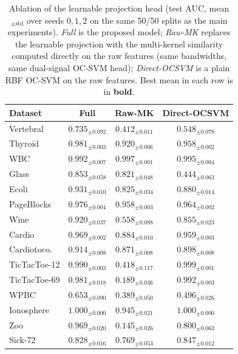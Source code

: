 \begin{table}[t]
\centering
\caption{Ablation of the learnable projection head (test AUC, mean$_{\pm\text{std}}$ over
seeds $0,1,2$ on the same 50/50 splits as the main experiments). \emph{Full} is the proposed
model; \emph{Raw-MK} replaces the learnable projection with the multi-kernel similarity
computed directly on the raw features (same bandwidths, same dual-signal OC-SVM head);
\emph{Direct-OCSVM} is a plain RBF OC-SVM on the raw features. Best mean in each row is in
\textbf{bold}.}
\label{tab:projhead}
\small
\setlength{\tabcolsep}{6pt}
\begin{tabular}{lccc}
\toprule
Dataset & Full & Raw-MK & Direct-OCSVM\\
\midrule
Vertebral     & $\mathbf{0.735}_{\pm0.092}$ & $0.412_{\pm0.011}$ & $0.548_{\pm0.078}$ \\
Thyroid       & $\mathbf{0.981}_{\pm0.003}$ & $0.920_{\pm0.006}$ & $0.958_{\pm0.002}$ \\
WBC           & $0.992_{\pm0.007}$ & $\mathbf{0.997}_{\pm0.001}$ & $0.995_{\pm0.004}$ \\
Glass         & $\mathbf{0.853}_{\pm0.058}$ & $0.821_{\pm0.048}$ & $0.444_{\pm0.063}$ \\
Ecoli         & $\mathbf{0.931}_{\pm0.010}$ & $0.825_{\pm0.034}$ & $0.880_{\pm0.014}$ \\
PageBlocks    & $\mathbf{0.976}_{\pm0.004}$ & $0.958_{\pm0.003}$ & $0.964_{\pm0.002}$ \\
Wine          & $\mathbf{0.920}_{\pm0.037}$ & $0.558_{\pm0.088}$ & $0.855_{\pm0.023}$ \\
Cardio        & $\mathbf{0.969}_{\pm0.002}$ & $0.884_{\pm0.010}$ & $0.959_{\pm0.003}$ \\
Cardiotoco.   & $\mathbf{0.914}_{\pm0.008}$ & $0.871_{\pm0.008}$ & $0.898_{\pm0.008}$ \\
TicTacToe-12  & $0.990_{\pm0.003}$ & $0.418_{\pm0.117}$ & $\mathbf{0.999}_{\pm0.001}$ \\
TicTacToe-69  & $0.981_{\pm0.018}$ & $0.189_{\pm0.036}$ & $\mathbf{0.992}_{\pm0.003}$ \\
WPBC          & $\mathbf{0.653}_{\pm0.090}$ & $0.389_{\pm0.050}$ & $0.496_{\pm0.026}$ \\
Ionosphere    & $\mathbf{1.000}_{\pm0.000}$ & $0.945_{\pm0.021}$ & $\mathbf{1.000}_{\pm0.000}$ \\
Zoo           & $\mathbf{0.969}_{\pm0.020}$ & $0.145_{\pm0.026}$ & $0.800_{\pm0.063}$ \\
Sick-72       & $0.828_{\pm0.016}$ & $0.769_{\pm0.053}$ & $\mathbf{0.847}_{\pm0.012}$ \\

\end{tabular}
\end{table}
